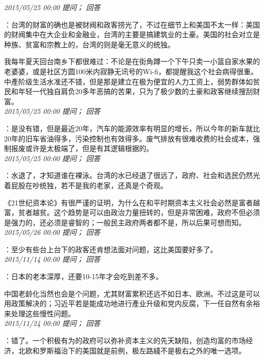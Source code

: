 \documentclass[twocolumn]{ctexart}
\begin{document}
\textit{\hfill\noindent\small 2015/05/25 00:00 提问； 回答}

：台湾的财富的确也是被财阀和政客捞光了，不过在细节上和美国不太一样：美国的财阀集中在大企业和金融业，台湾的主要是搞建筑业的土豪。美国的社会对立是种族、贫富和宗教上的，台湾的则是毫无意义的统独。

我每年夏天回台南乡下都很难过：不论是在街角蹲一个下午只卖一小篮自家水果的老婆婆，或是社区方圆100米内寂静无讯号的Wi-fi，都提醒我这个社会病得很重。中產阶级生活水准还不错，但是那是建立在极为便宜的人力工资上，弱势群体如贫民和年轻一代独自肩负20多年恶搞的苦果，只为了极少数的土豪和政客继续搜刮财富。\\

\textit{\hfill\noindent\small 2015/05/25 00:00 提问； 回答}

：是没有错，但是最近20年，汽车的能源效率有明显的增长，所以今年的新车就比20年的旧车省油得多，污染控制也有效得多。废气排放有很难收费的社会成本，强制报废或许是太极端了，但是有其逻辑根据的。\\

\textit{\hfill\noindent\small 2015/05/25 00:00 提问； 回答}

：水退了，才知道谁在裸泳。台湾的水已经退了很远了，政府、社会和选民仍然光着屁股在吵统独，若不是我的老家，还真是个奇观。

《21世纪资本论》有很严谨的证明，为什么在和平时期资本主义社会必然是富者越富，贫者越贫。这个趋势是可以由政治力量扭转的，但是非常困难，政府不但必须是强力的，还必须是睿智的；一般民主政府两者都不是，所以后果可想而知。\\

\textit{\hfill\noindent\small 2015/05/26 00:00 提问； 回答}

：至少有些台上台下的政客还肯想法面对问题，这比美国要好多了。\\

\textit{\hfill\noindent\small 2015/11/14 00:00 提问； 回答}

：日本的老本深厚，还要10-15年才会吃到差不多。

中国老龄化当然也会是个问题，尤其财富累积还远不如日本、欧洲。不过这是可以用政策解决的；习近平若是能成功地进行產业升级和党内反腐，下一任自然有余裕来处理这些慢性问题。\\

\textit{\hfill\noindent\small 2015/11/24 00:00 提问； 回答}

：错了。一个积极有为的政府可以弥补资本主义的先天缺陷，创造均富的市场经济，北欧和罗斯福治下的美国就是前例，极左路綫不是极右之外的唯一选项。\\
\end{document}
